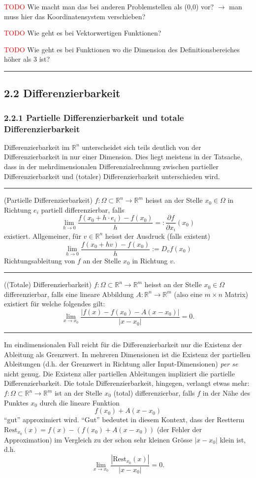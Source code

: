 \documentclass[a4paper,landscape,8pt]{extarticle}
\newcommand{\R}{\mathbb{R}}
\newcommand{\abs}[1]{\left\lvert #1 \right\rvert}
\newcommand{\todo}{\textcolor{red}{TODO }}
\newcommand{\sep}{\vspace{5pt}\noindent\hrule\vspace{5pt}}
\begin{document}
\begin{multicols*}{4}
\todo{Wie macht man das bei anderen Problemstellen als (0,0) vor? $\to$ man muss
hier das Koordinatensystem verschieben?}

\todo{Wie geht es bei Vektorwertigen Funktionen?}

\todo{Wie geht es bei Funktionen wo die Dimension des Definitionsbereiches höher
als 3 ist?}

\sep

\subsection{2.2 Differenzierbarkeit}

\subsubsection{2.2.1 Partielle Differenzierbarkeit und totale
Differenzierbarkeit}

Differenzierbarkeit im $\R^n$ unterscheidet sich teils deutlich von der
Differenzierbarkeit in nur einer Dimension. Dies liegt meistens in der Tatsache,
dass in der mehrdimensionalen Differenzialrechnung zwischen partieller
Differenzierbarkeit und (totaler) Differenzierbarkeit unterschieden wird.

\sep

\Def (Partielle Differenzierbarkeit) $f\colon\Omega\subset\R^n\to\R^m$ heisst
an der Stelle $x_0\in\Omega$ in Richtung $e_i$ partiell differenzierbar, falls
\[
\lim_{h\to 0}\frac{f(x_0+h\cdot e_i) - f(x_0)}{h}
=:\frac{\partial f}{\partial x_i}(x_0)
\]
existiert. Allgemeiner, für $v\in\R^n$ heisst der Ausdruck (falls existent)
\[
\lim_{h\to 0} \frac{f(x_0+hv)-f(x_0)}{h}
:= D_vf(x_0)
\]
Richtungsableitung von $f$ an der Stelle $x_0$ in Richtung $v$.

\sep

\Def ((Totale) Differenzierbarkeit) $f\colon\Omega\subset\R^n\to\R^m$ heisst an
der Stelle $x_0\in\Omega$ differenzierbar, falls eine lineare Abbildung
$A\colon \R^n\to\R^m$ (also eine $m\times n$ Matrix) existiert für welche
folgendes gilt:
\[
\lim_{x\to x_0} \frac{\abs{f(x)-f(x_0)-A(x-x_0)}}{\abs{x-x_0}} = 0.
\]

\sep

Im eindimensionalen Fall reicht für die Differenzierbarkeit nur die Existenz der
Ableitung als Grenzwert. In mehreren Dimensionen ist die Existenz der partiellen
Ableitungen (d.h. der Grenzwert in Richtung aller Input-Dimensionen) \emph{per
se} nicht genug. Die Existenz aller partiellen Ableitungen impliziert die
partielle Differenzierbarkeit. Die totale Differenzierbarkeit, hingegen,
verlangt etwas mehr: $f\colon\Omega\subset\R^n\to\R^m$ ist an der Stelle $x_0$
(total) differenzierbar, falls $f$ in der Nähe des Punktes $x_0$ durch die
lineare Funktion \[ f(x_0) + A(x - x_0) \] ``gut'' approximiert wird. ``Gut''
bedeutet in diesem Kontext, dass der Restterm
$\text{Rest}_{x_0}(x)=f(x)-(f(x_0)+A(x-x_0))$ (der Fehler der Approximation) im
Vergleich zu der schon sehr kleinen Grösse $\abs{x - x_0}$ klein ist, d.h.
\[ \lim_{x\to x_0} \frac{\abs{\text{Rest}_{x_0}(x)}}{\abs{x-x_0}} = 0.
\]


\end{multicols*}
\end{document}
